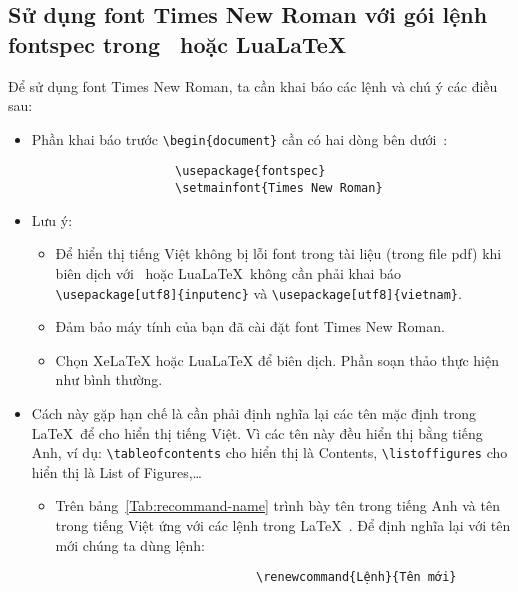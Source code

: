 \documentclass[12pt,a4paper]{article}
\begin{document}
\subsection{Sử dụng font Times New Roman với gói lệnh fontspec trong \XeLaTeX\ hoặc Lua\LaTeX}
	Để sử dụng font Times New Roman, ta cần khai báo các lệnh và chú ý các điều sau:
		\begin{itemize}
			\item Phần khai báo trước \verb|\begin{document}| cần có hai dòng bên dưới~\cite{fontspec-chandrahas, fontspec-stackexchange}:
				\begin{verbatim}
					\usepackage{fontspec}
					\setmainfont{Times New Roman}
				\end{verbatim}
			
			\item Lưu ý:
				\begin{itemize}
					\item Để hiển thị tiếng Việt không bị lỗi font trong tài liệu (trong file pdf) khi biên dịch với \XeLaTeX\ hoặc Lua\LaTeX\ không cần phải khai báo \verb|\usepackage[utf8]{inputenc}| và \verb|\usepackage[utf8]{vietnam}|.		
					
					\item Đảm bảo máy tính của bạn đã cài đặt font Times New Roman.
					
					\item Chọn XeLaTeX hoặc LuaLaTeX để biên dịch. Phần soạn thảo thực hiện như bình thường.
				\end{itemize}
			
			\item Cách này gặp hạn chế là cần phải định nghĩa lại các tên mặc định trong \LaTeX\ để cho hiển thị tiếng Việt. Vì các tên này đều hiển thị bằng tiếng Anh, ví dụ: \verb|\tableofcontents| cho hiển thị là Contents, \verb|\listoffigures| cho hiển thị là List of Figures,\ldots
				\begin{itemize}
					\item Trên bảng~\ref{Tab:recommand-name} trình bày tên trong tiếng Anh và tên trong tiếng Việt ứng với các lệnh trong \LaTeX~\cite{nguyenhuudien}. Để định nghĩa lại với tên mới chúng ta dùng lệnh:
						\begin{verbatim}
							\renewcommand{Lệnh}{Tên mới}
						\end{verbatim}
						

\end{itemize}
\end{itemize}
\end{document}
